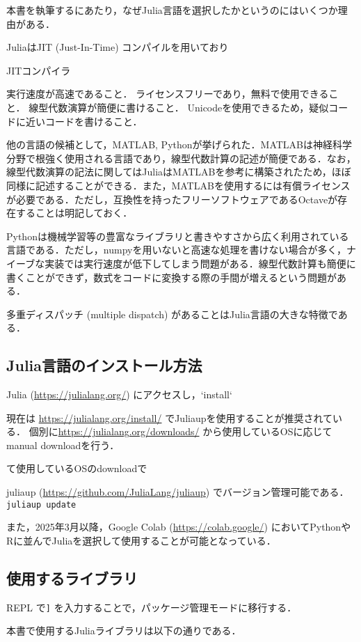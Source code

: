 \documentclass[titlepage]{ltjsbook}
\newcommand{\jl}{\lstinline[language=julia]}
\begin{document}
本書を執筆するにあたり，なぜJulia言語を選択したかというのにはいくつか理由がある．

JuliaはJIT (Just-In-Time) コンパイルを用いており

JITコンパイラ

実行速度が高速であること．
ライセンスフリーであり，無料で使用できること．
線型代数演算が簡便に書けること．
Unicodeを使用できるため，疑似コードに近いコードを書けること．

他の言語の候補として，MATLAB, Pythonが挙げられた．MATLABは神経科学分野で根強く使用される言語であり，線型代数計算の記述が簡便である．なお，線型代数演算の記法に関してはJuliaはMATLABを参考に構築されたため，ほぼ同様に記述することができる．また，MATLABを使用するには有償ライセンスが必要である．ただし，互換性を持ったフリーソフトウェアであるOctaveが存在することは明記しておく．

Pythonは機械学習等の豊富なライブラリと書きやすさから広く利用されている言語である．ただし，numpyを用いないと高速な処理を書けない場合が多く，ナイーブな実装では実行速度が低下してしまう問題がある．線型代数計算も簡便に書くことができず，数式をコードに変換する際の手間が増えるという問題がある．

多重ディスパッチ (multiple dispatch) があることはJulia言語の大きな特徴である．

\subsection{Julia言語のインストール方法}
Julia (\url{https://julialang.org/}) にアクセスし，`install` 

現在は \url{https://julialang.org/install/} でJuliaupを使用することが推奨されている．
個別に\url{https://julialang.org/downloads/} から使用しているOSに応じてmanual downloadを行う．

て使用しているOSのdownloadで

juliaup (\url{https://github.com/JuliaLang/juliaup}) でバージョン管理可能である．\jl{juliaup update}

また，2025年3月以降，Google Colab (\url{https://colab.google/}) においてPythonやRに並んでJuliaを選択して使用することが可能となっている．

\subsection{使用するライブラリ}

REPL
で\jl{]} を入力することで，パッケージ管理モードに移行する．

本書で使用するJuliaライブラリは以下の通りである．
\end{document}
